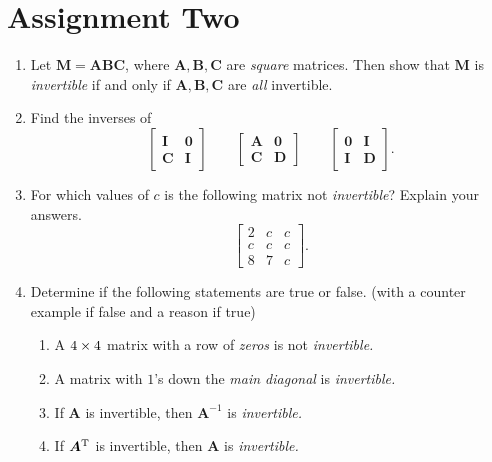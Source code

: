 \section{Assignment Two}
\begin{enumerate}
\item
Let $\bm M=\bm{ABC}$, where $\bm A,\bm B,\bm C$ are \textit{square} matrices. Then show that $\bm M$ is \textit{invertible} if and only if $\bm A,\bm B,\bm C$ are \emph{all} invertible.
\item
Find the inverses of
\[
\begin{bmatrix}
\bm I&\bm0\\\bm C&\bm I
\end{bmatrix}\qquad\begin{bmatrix}
\bm A&\bm0\\\bm C&\bm D
\end{bmatrix}\qquad\begin{bmatrix}
\bm0&\bm I\\\bm I&\bm D
\end{bmatrix}.
\]
\item
For which values of $c$ is the following matrix not \textit{invertible}? Explain your answers.
\[
\begin{bmatrix}
2&c&c\\c&c&c\\8&7&c
\end{bmatrix}.
\]
\item
Determine if the following statements are true or false. (with a counter example if false and a reason if true)
\begin{enumerate}
\item
A $4\times 4$ matrix with a row of \emph{zeros} is not \textit{invertible.}
\item
A matrix with $1$'s down the \textit{main diagonal} is \textit{invertible.}
\item
If $\bm A$ is invertible, then $\bm A^{-1}$ is \textit{invertible.}
\item
If $\bm A^{\mathrm T}$ is invertible, then $\bm A$ is \textit{invertible.}
\end{enumerate}
\end{enumerate}